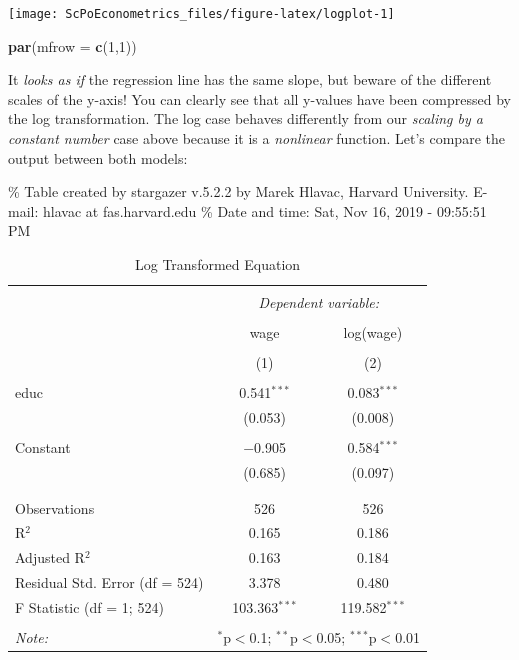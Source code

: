 \documentclass[]{book}
\newenvironment{Shaded}{\begin{snugshade}}{\end{snugshade}}
\newcommand{\KeywordTok}[1]{\textcolor[rgb]{0.13,0.29,0.53}{\textbf{#1}}}
\newcommand{\DataTypeTok}[1]{\textcolor[rgb]{0.13,0.29,0.53}{#1}}
\newcommand{\DecValTok}[1]{\textcolor[rgb]{0.00,0.00,0.81}{#1}}
\newcommand{\NormalTok}[1]{#1}
\begin{document}
\begin{center}\texttt{[image: ScPoEconometrics\_files/figure-latex/logplot-1]} \end{center}

\begin{Shaded}
\begin{Highlighting}[]
\KeywordTok{par}\NormalTok{(}\DataTypeTok{mfrow =} \KeywordTok{c}\NormalTok{(}\DecValTok{1}\NormalTok{,}\DecValTok{1}\NormalTok{))}
\end{Highlighting}
\end{Shaded}

It \emph{looks as if} the regression line has the same slope, but beware
of the different scales of the y-axis! You can clearly see that all
y-values have been compressed by the log transformation. The log case
behaves differently from our \emph{scaling by a constant number} case
above because it is a \emph{nonlinear} function. Let's compare the
output between both models:

\% Table created by stargazer v.5.2.2 by Marek Hlavac, Harvard
University. E-mail: hlavac at fas.harvard.edu \% Date and time: Sat, Nov
16, 2019 - 09:55:51 PM

\begin{table}[!htbp] \centering 
  \caption{Log Transformed Equation} 
  \label{} 
\begin{tabular}{@{\extracolsep{5pt}}lcc} 
\\[-1.8ex]\hline 
\hline \\[-1.8ex] 
 & \multicolumn{2}{c}{\textit{Dependent variable:}} \\ 
\cline{2-3} 
\\[-1.8ex] & wage & log(wage) \\ 
\\[-1.8ex] & (1) & (2)\\ 
\hline \\[-1.8ex] 
 educ & 0.541$^{***}$ & 0.083$^{***}$ \\ 
  & (0.053) & (0.008) \\ 
  & & \\ 
 Constant & $-$0.905 & 0.584$^{***}$ \\ 
  & (0.685) & (0.097) \\ 
  & & \\ 
\hline \\[-1.8ex] 
Observations & 526 & 526 \\ 
R$^{2}$ & 0.165 & 0.186 \\ 
Adjusted R$^{2}$ & 0.163 & 0.184 \\ 
Residual Std. Error (df = 524) & 3.378 & 0.480 \\ 
F Statistic (df = 1; 524) & 103.363$^{***}$ & 119.582$^{***}$ \\ 
\hline 
\hline \\[-1.8ex] 
\textit{Note:}  & \multicolumn{2}{r}{$^{*}$p$<$0.1; $^{**}$p$<$0.05; $^{***}$p$<$0.01} \\ 
\end{tabular} 
\end{table}
\end{document}
